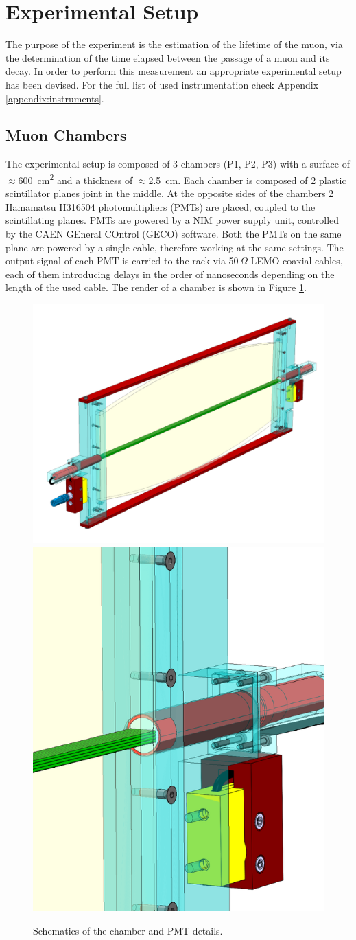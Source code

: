 \documentclass[../main.tex]{subfiles}
\begin{document}
\section{Experimental Setup}
The purpose of the experiment is the estimation of the lifetime of the muon, via the determination of the time elapsed between the passage of a muon and its decay. In order to perform this measurement an appropriate experimental setup has been devised. For the full list of used instrumentation check Appendix \ref{appendix:instruments}.


\subsection{Muon Chambers}
The experimental setup is composed of 3 chambers (P1, P2, P3) with a surface of \mbox{$\approx$\SI{600}{\centi \metre^2}} and a thickness of $\approx$\SI{2.5}{\centi \metre}. %
Each chamber is composed of 2 plastic scintillator planes joint in the middle. At the opposite sides of the chambers 2 Hamamatsu H316504 photomultipliers (PMTs) are placed, coupled to the scintillating planes. PMTs are powered by a NIM power supply unit, controlled by the CAEN GEneral COntrol (GECO) software. Both the PMTs on the same plane are powered by a single cable, therefore working at the same settings. The output signal of each PMT is carried to the rack via 50\,$\Omega$ LEMO coaxial cables, each of them introducing delays in the order of nanoseconds depending on the length of the used cable. The render of a chamber is shown in Figure \ref{fig:chamber}.

\begin{figure}[htb]
    \centering
    \includegraphics[width=0.5 \linewidth]{images/chamber.png} \hspace{0.3 cm}
    \includegraphics[width=0.3 \linewidth]{images/chamber3.png}
    \caption{Schematics of the chamber and PMT details.}
    \label{fig:chamber}
\end{figure}
\end{document}
